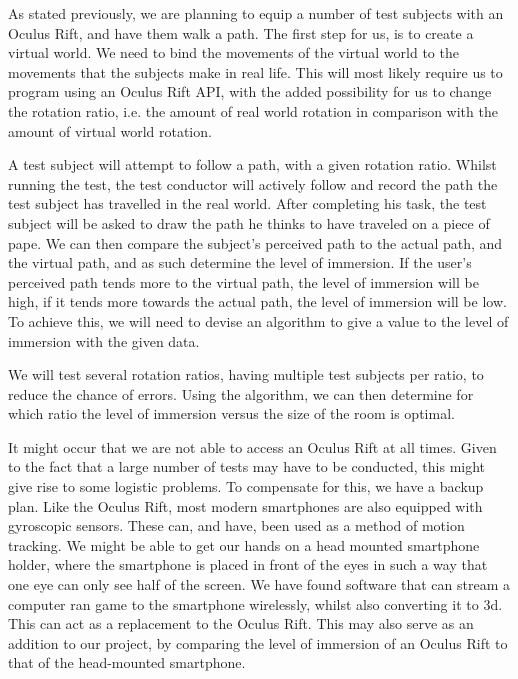 As stated previously, we are planning to equip a number of test subjects with an Oculus Rift, and have them walk a path.
The first step for us, is to create a virtual world.
We need to bind the movements of the virtual world to the movements that the subjects make in real life.
This will most likely require us to program using an Oculus Rift API, with the added possibility for us to change the rotation ratio, i.e. the amount of real world rotation in comparison with the amount of virtual world rotation.

A test subject will attempt to follow a path, with a given rotation ratio.
Whilst running the test, the test conductor will actively follow and record the path the test subject has travelled in the real world. After completing his task, the test subject will be asked to draw the path he thinks to have traveled on a piece of pape.
We can then compare the subject's perceived path to the actual path, and the virtual path, and as such determine the level of immersion.
If the user's perceived path tends more to the virtual path, the level of immersion will be high, if it tends more towards the actual path, the level of immersion will be low.
To achieve this, we will need to devise an algorithm to give a value to the level of immersion with the given data.

We will test several rotation ratios, having multiple test subjects per ratio, to reduce the chance of errors.
Using the algorithm, we can then determine for which ratio the level of immersion versus the size of the room is optimal.

It might occur that we are not able to access an Oculus Rift at all times.
Given to the fact that a large number of tests may have to be conducted, this might give rise to some logistic problems.
To compensate for this, we have a backup plan.
Like the Oculus Rift, most modern smartphones are also equipped with gyroscopic sensors.
These can, and have, been used as a method of motion tracking.
We might be able to get our hands on a head mounted smartphone holder, where the smartphone is placed in front of the eyes in such a way that one eye can only see half of the screen.
We have found software that can stream a computer ran game to the smartphone wirelessly, whilst also converting it to 3d.
This can act as a replacement to the Oculus Rift. This may also serve as an addition to our project, by comparing the level of immersion of an Oculus Rift to that of the head-mounted smartphone.  

